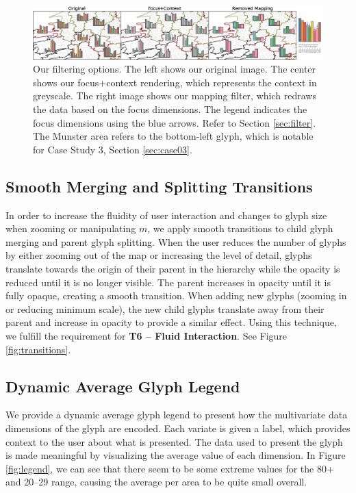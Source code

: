 \begin{figure}[t]
\centering
\includegraphics[width=1\textwidth]{images/ch5/f+cv2}
\caption{Our filtering options. The left shows our original image. The center shows our focus+context rendering, which represents the context in greyscale. The right image shows our mapping filter, which redraws the data based on the focus dimensions. The legend indicates the focus dimensions using the blue arrows. Refer to Section \ref{sec:filter}. The Munster area refers to the bottom-left glyph, which is notable for Case Study 3, Section \ref{sec:case03}.} \label{fig:f+c}  \vspace{-0.2cm}
\end{figure}

\subsection{Smooth Merging and Splitting Transitions} \label{sec:transitions}
In order to increase the fluidity of user interaction and changes to glyph size when zooming or manipulating $m$, we apply smooth transitions to child glyph merging and parent glyph splitting. When the user reduces the number of glyphs by either zooming out of the map or increasing the level of detail, glyphs translate towards the origin of their parent in the hierarchy while the opacity is reduced until it is no longer visible. The parent increases in opacity until it is fully opaque, creating a smooth transition. When adding new glyphs (zooming in or reducing minimum scale), the new child glyphs translate away from their parent and increase in opacity to provide a similar effect. Using this technique, we fulfill the requirement for \textbf{T6 -- Fluid Interaction}. See Figure \ref{fig:transitions}.

\subsection{Dynamic Average Glyph Legend} \label{sec:legend}
We provide a dynamic average glyph legend to present how the multivariate data dimensions of the glyph are encoded. Each variate is given a label, which provides context to the user about what is presented. The data used to present the glyph is made meaningful by visualizing the average value of each dimension. In Figure \ref{fig:legend}, we can see that there seem to be some extreme values for the 80+ and 20--29 range, causing the average per area to be quite small overall.


